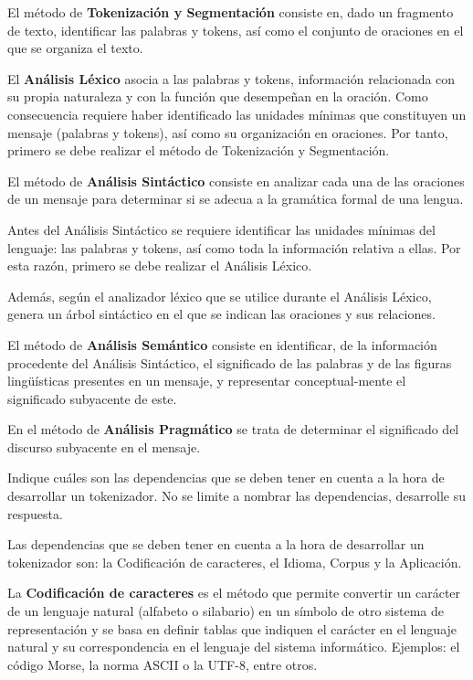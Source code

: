 \documentclass[11pt]{exam}
\begin{document}
\begin{questions}
El método de {\bf Tokenización y Segmentación} consiste en, dado un fragmento de texto, identificar las palabras y tokens, así como el conjunto de oraciones en el que se organiza el texto.

El {\bf Análisis Léxico} asocia a las palabras y tokens, información relacionada con su propia naturaleza y con la función que desempeñan en la oración. Como consecuencia requiere haber identificado las unidades mínimas que constituyen un mensaje (palabras y tokens), así como su organización en oraciones. Por tanto, primero se debe realizar el método de Tokenización y Segmentación.

El método de {\bf Análisis Sintáctico} consiste en analizar cada una de las oraciones de un mensaje para determinar si se adecua a la gramática formal de una lengua. 

Antes del Análisis Sintáctico se requiere identificar las unidades mínimas del lenguaje: las palabras y tokens, así como toda la información relativa a ellas. Por esta razón, primero se debe realizar el Análisis Léxico.

Además, según el analizador léxico que se utilice durante el Análisis Léxico, genera un árbol sintáctico en el que se indican las oraciones y sus relaciones.

El método de {\bf Análisis Semántico} consiste en identificar, de la información procedente del Análisis Sintáctico, el significado de las palabras y de las figuras lingüísticas presentes en un mensaje, y representar conceptual-mente el significado subyacente de este.

En el método de {\bf Análisis Pragmático} se trata de determinar el significado del discurso subyacente en el mensaje.

\question Indique cuáles son las dependencias que se deben tener en cuenta a la hora de desarrollar un tokenizador. No se limite a nombrar las dependencias, desarrolle su respuesta.

Las dependencias que se deben tener en cuenta a la hora de desarrollar un tokenizador son: la Codificación de caracteres, el Idioma, Corpus y la Aplicación.

La {\bf Codificación de caracteres} es el método que permite convertir un carácter de un lenguaje natural (alfabeto o silabario) en un símbolo de otro sistema de representación y se basa en definir tablas que indiquen el carácter en el lenguaje natural y su correspondencia en el lenguaje del sistema informático. Ejemplos: el código Morse, la norma ASCII o la UTF-8, entre otros. 


\end{questions}
\end{document}
